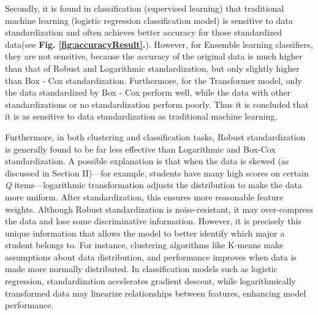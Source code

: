 \documentclass[conference]{IEEEtran}
\begin{document}
Secondly, it is found in classification (supervised learning) that traditional machine learning (logistic regression classification model) is sensitive to data standardization and often achieves better accuracy for those standardized data(see \textbf{Fig. \ref{fig:accuracyResult}.}). However, for Ensemble learning classifiers, they are not sensitive, because the accuracy of the original data is much higher than that of Robust and Logarithmic standardization, but only slightly higher than Box - Cox standardization. Furthermore, for the Transformer model, only the data standardized by Box - Cox perform well, while the data with other standardizations or no standardization perform poorly. Thus it is concluded that it is as sensitive to data standardization as traditional machine learning.  


Furthermore, in both clustering and classification tasks, Robust standardization is generally found to be far less effective than Logarithmic and Box-Cox standardization. A possible explanation is that when the data is skewed (as discussed in Section II)—for example, students have many high scores on certain \textit{Q} items—logarithmic transformation adjusts the distribution to make the data more uniform. After standardization, this ensures more reasonable feature weights. Although Robust standardization is noise-resistant, it may over-compress the data and lose some discriminative information. However, it is precisely this unique information that allows the model to better identify which major a student belongs to. For instance, clustering algorithms like K-means make assumptions about data distribution, and performance improves when data is made more normally distributed. In classification models such as logistic regression, standardization accelerates gradient descent, while logarithmically transformed data may linearize relationships between features, enhancing model performance.
\end{document}

